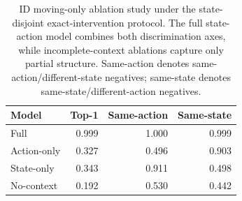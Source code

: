 \begin{table}[t]
\centering
\small
\begin{tabular}{lrrr}
\toprule
Model & Top-1 & Same-action & Same-state \\
\midrule
Full & 0.999 & 1.000 & 0.999 \\
Action-only & 0.327 & 0.496 & 0.903 \\
State-only & 0.343 & 0.911 & 0.498 \\
No-context & 0.192 & 0.530 & 0.442 \\
\bottomrule
\end{tabular}
\caption{ID moving-only ablation study under the state-disjoint exact-intervention protocol. The full state-action model combines both discrimination axes, while incomplete-context ablations capture only partial structure. Same-action denotes same-action/different-state negatives; same-state denotes same-state/different-action negatives.}
\label{tab:id_ablation}
\end{table}
